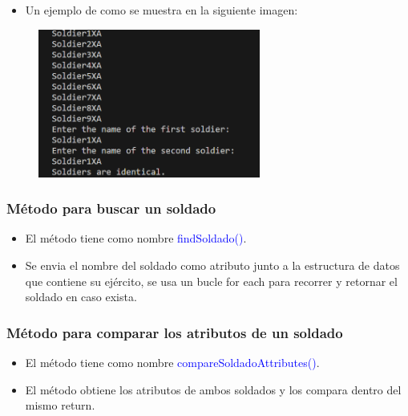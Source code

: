 \documentclass{article}
\begin{document}
\begin{itemize}\begin{itemize}\item Un ejemplo de como se muestra en la siguiente imagen:
\end{itemize}\end{itemize}
\begin{figure}[H]
    \centering
    \includegraphics[width=0.65\textwidth,keepaspectratio]{img/12compareSoldiers.png}
    \caption{}
\end{figure}


\subsubsection{Método para buscar un soldado}
\begin{itemize}
    \item El método tiene como nombre \textcolor{blue}{findSoldado()}.
    \item Se envia el nombre del soldado como atributo junto a la estructura de datos que contiene su ejército, se usa un bucle for each para recorrer y retornar el soldado en caso exista.
\end{itemize}



\subsubsection{Método para comparar los atributos de un soldado}
\begin{itemize}
    \item El método tiene como nombre \textcolor{blue}{compareSoldadoAttributes()}.
    \item El método obtiene los atributos de ambos soldados y los compara dentro del mismo return.
\end{itemize}

\end{document}
